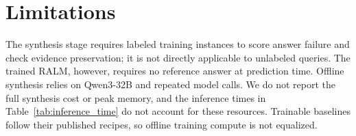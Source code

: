 \documentclass[11pt]{article}
\begin{document}








\section*{Limitations}
The synthesis stage requires labeled training instances to score answer failure and check evidence preservation; it is not directly applicable to unlabeled queries. The trained RALM, however, requires no reference answer at prediction time. Offline synthesis relies on Qwen3-32B and repeated model calls. We do not report the full synthesis cost or peak memory, and the inference times in Table~\ref{tab:inference_time} do not account for these resources. Trainable baselines follow their published recipes, so offline training compute is not equalized.
\end{document}
